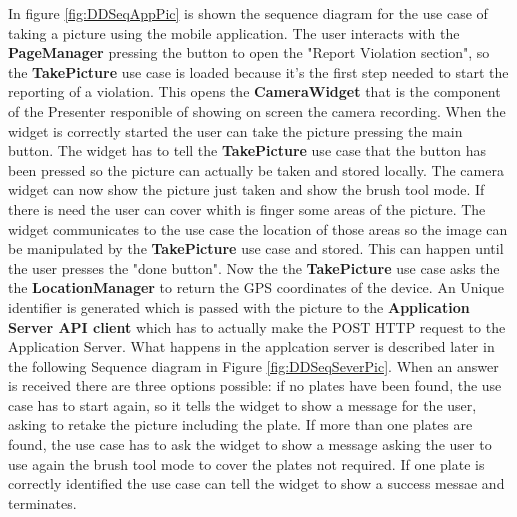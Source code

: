 In figure \ref{fig:DDSeqAppPic} is shown the sequence diagram for the use case of taking a picture using the mobile application.
The user interacts with the \textbf{PageManager} pressing the button to open the "Report Violation section", so the \textbf{TakePicture} use case is loaded because it's the first step needed to start the reporting of a violation. This opens the \textbf{CameraWidget} that is the component of the Presenter responible of showing on screen the camera recording. When the widget is correctly started the user can take the picture pressing the main button. The widget has to tell the \textbf{TakePicture} use case that the button has been pressed so the picture can  actually be taken and stored locally. The camera widget can now show the picture just taken and show the brush tool mode. If there is need the user can cover whith is finger some areas of the picture. The widget communicates to the use case the location of those areas so the image can be manipulated by the \textbf{TakePicture} use case and stored. This can happen until the user presses the "done button". Now the the \textbf{TakePicture} use case asks the the \textbf{LocationManager} to return the GPS coordinates of the device. An Unique identifier is generated which is passed with the picture to the \textbf{Application Server API client} which has to actually make the POST HTTP request to the Application Server. What happens in the applcation server is described later in the following Sequence diagram in Figure \ref{fig:DDSeqSeverPic}.
When an answer is received there are three options possible: if no plates have been found, the use case has to start again, so it tells the widget to show a message for the user, asking to retake the picture including the plate.
If more than one plates are found, the use case has to ask the widget to show a message asking the user to use again the brush tool mode to cover the plates not required. If one plate is correctly identified the use case can tell the widget to show a success messae and terminates. %

